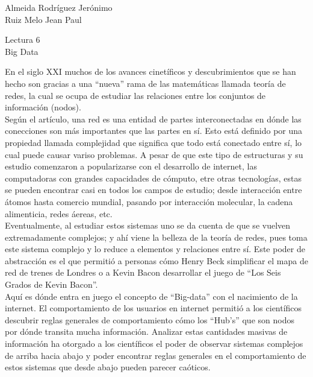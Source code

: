 \documentclass[a4paper, 12pt]{report}
\begin{document}
\begin{flushright}
    Almeida Rodríguez Jerónimo\\
    Ruiz Melo Jean Paul
\end{flushright}

\begin{center}
    {\LARGE Lectura 6}\\
    {\LARGE Big Data}
\end{center}

En el siglo XXI muchos de los avances cinetíficos y descubrimientos que se han
hecho son gracias a una ``nueva'' rama de las matemáticas llamada teoría de
redes, la cual se ocupa de estudiar las relaciones entre los conjuntos de
información (nodos).\\

Según el artículo, una red es una entidad de partes interconectadas en dónde las
conecciones son más importantes que las partes en sí. Esto está definido por una
propiedad llamada complejidad que significa que todo está conectado entre sí, lo
cual puede causar variso problemas. A pesar de que este tipo
de estructuras y su estudio comenzaron a popularizarse con el desarrollo de
internet, las computadoras con grandes capacidades de cómputo, etre otras
tecnologías, estas se pueden encontrar casi en todos los campos de estudio;
desde interacción entre átomos hasta comercio mundial, pasando por interacción
molecular, la cadena alimenticia, redes áereas, etc.\\

Eventualmente, al estudiar estos sistemas uno se da cuenta de que se vuelven
extremadamente complejos; y ahí viene la belleza de la teoría de redes, pues toma
este sistema complejo y lo reduce a elementos y relaciones entre sí. Este poder
de abstracción es el que permitió a personas cómo Henry Beck simplificar el mapa
de red de trenes de Londres o a Kevin Bacon desarrollar el juego de ``Los Seis
Grados de Kevin Bacon''.\\

Aquí es dónde entra en juego el concepto de ``Big-data'' con el nacimiento de la
internet. El comportamiento de los usuarios en internet permitió a los
científicos descubrir reglas generales de comportamiento cómo los ``Hub's'' que
son nodos por dónde transita mucha información. Analizar estas cantidades
masivas de información ha otorgado a los científicos el poder de observar
sistemas complejos de arriba hacia abajo y poder encontrar reglas generales en
el comportamiento de estos sistemas que desde abajo pueden parecer caóticos.
\end{document}
